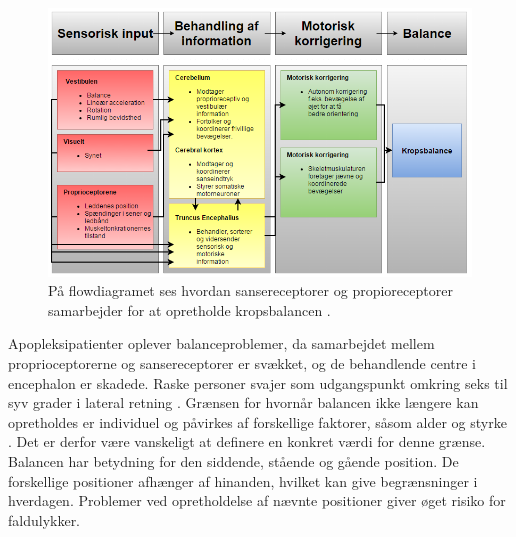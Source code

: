 \begin{figure}[H]
	\centering
	\includegraphics[scale=0.65]{figures/bProblemanalyse/Balance-Flowdiagram.png}
	\caption{På flowdiagramet ses hvordan sansereceptorer og propioreceptorer samarbejder for at opretholde kropsbalancen \cite{watson2015}.}
	\label{flowbalance1}
\end{figure}

\noindent Apopleksipatienter oplever balanceproblemer, da samarbejdet mellem proprioceptorerne og sansereceptorer er svækket, og de behandlende centre i encephalon er skadede. \cite{Martini2012} Raske personer svajer som udgangspunkt omkring seks til syv grader i lateral retning \cite{Wang2010,Huo1999}. Grænsen for hvornår balancen ikke længere kan opretholdes er individuel og påvirkes af forskellige faktorer, såsom alder og styrke \cite{Huo1999}. Det er derfor være vanskeligt at definere en konkret værdi for denne grænse. \\ 
Balancen har betydning for den siddende, stående og gående position. De forskellige positioner afhænger af hinanden, hvilket kan give begrænsninger i hverdagen. Problemer ved opretholdelse af nævnte positioner giver øget risiko for faldulykker. \cite{Karnath2003} 

